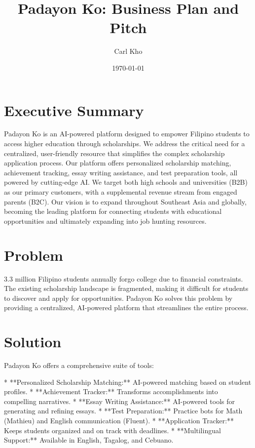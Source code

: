 \documentclass{article}
\title{Padayon Ko: Business Plan and Pitch}
\author{Carl Kho}
\date{\today}
\begin{document}
\maketitle

\section{Executive Summary}

Padayon Ko is an AI-powered platform designed to empower Filipino students to access higher education through scholarships. We address the critical need for a centralized, user-friendly resource that simplifies the complex scholarship application process. Our platform offers personalized scholarship matching, achievement tracking, essay writing assistance, and test preparation tools, all powered by cutting-edge AI.  We target both high schools and universities (B2B) as our primary customers, with a supplemental revenue stream from engaged parents (B2C).  Our vision is to expand throughout Southeast Asia and globally, becoming the leading platform for connecting students with educational opportunities and ultimately expanding into job hunting resources.


\section{Problem}

3.3 million Filipino students annually forgo college due to financial constraints.  The existing scholarship landscape is fragmented, making it difficult for students to discover and apply for opportunities.  Padayon Ko solves this problem by providing a centralized, AI-powered platform that streamlines the entire process.

\section{Solution}

Padayon Ko offers a comprehensive suite of tools:

* **Personalized Scholarship Matching:** AI-powered matching based on student profiles.
* **Achievement Tracker:** Transforms accomplishments into compelling narratives.
* **Essay Writing Assistance:**  AI-powered tools for generating and refining essays.
* **Test Preparation:** Practice bots for Math (Mathieu) and English communication (Fluent).
* **Application Tracker:** Keeps students organized and on track with deadlines.
* **Multilingual Support:** Available in English, Tagalog, and Cebuano.
\end{document}
